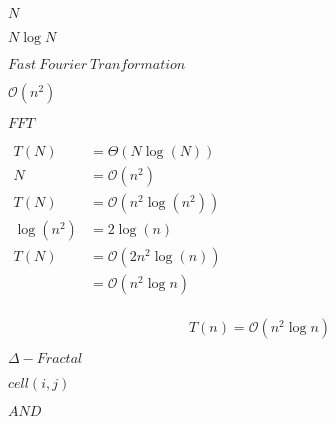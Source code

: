 \documentclass[10pt]{book}
\begin{document}
\begin{mdSnippets}
\begin{mdInlineSnippet}[8d9c307cb7f3c4a32822a51922d1ceaa]%
$N$\end{mdInlineSnippet}%
\begin{mdInlineSnippet}[45a8346595e74ec07c1a29188a18e11e]%
$N \log N$\end{mdInlineSnippet}%
\begin{mdInlineSnippet}[a52b89591425f6710647617e2b4e0518]%
$Fast~Fourier~Tranformation$\end{mdInlineSnippet}%
\begin{mdInlineSnippet}[551894444bf3cb0cc8350594310e2e99]%
$\mathcal{O}(n^2)$\end{mdInlineSnippet}%
\begin{mdInlineSnippet}[86de502ad3fe05ceedaba87164d54d28]%
$FFT$\end{mdInlineSnippet}%
\begin{mdInlineSnippet}[1ed00da9e6325904bce760c3bf9c9100]%
$\begin{aligned}T(N) &= \Theta(N \log (N))\\N &= \mathcal{O}(n^2)\\ T(N) &= \mathcal{O}(n^2 \log(n^2))\\\log(n^2) &= 2 \log (n)\\T(N) &= \mathcal{O}(2 n^2 \log(n))\\&= \mathcal{O}(n^2 \log n)\\\end{aligned}$\end{mdInlineSnippet}%
\begin{mdDisplaySnippet}%
\[%
T(n) = \mathcal{O}(n^2 \log n)
\]%
\end{mdDisplaySnippet}%
\begin{mdInlineSnippet}[2b9651eb6aa1184781caae2f07147b7e]%
$\Delta - Fractal$\end{mdInlineSnippet}%
\begin{mdInlineSnippet}[c7fe7a31f5202cca0076f64c52f6058d]%
$cell (i,j)$\end{mdInlineSnippet}%
\begin{mdInlineSnippet}[558ffc8f5770d8e4f95f51d822685532]%
$AND$\end{mdInlineSnippet}%

\end{mdSnippets}
\end{document}
